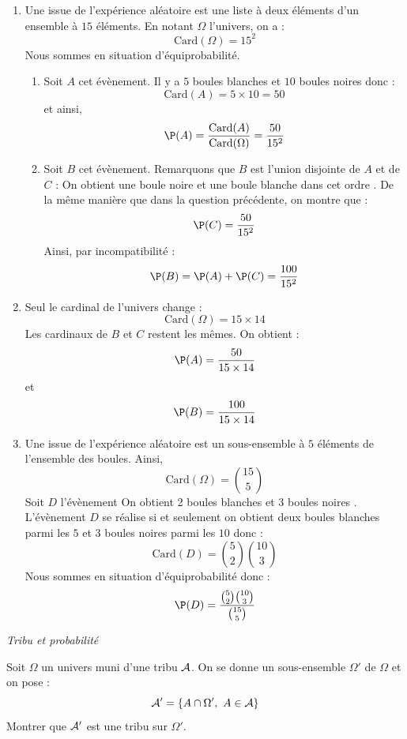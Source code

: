 \documentclass[a4paper,10pt]{report}
\begin{document}
\corr 

\begin{enumerate}
\item Une issue de l'expérience aléatoire est une liste à deux éléments d'un ensemble à $15$ éléments. En notant $\Omega$ l'univers, on a :
$$ \textrm{Card}(\Omega)= 15^2$$
Nous sommes en situation d'équiprobabilité.

\begin{enumerate}
\item Soit $A$ cet évènement. Il y a $5$ boules blanches et $10$ boules noires donc :
$$ \textrm{Card}(A)= 5 \times 10 = 50$$
et ainsi,
$$ \P(A) = \dfrac{\textrm{Card}(A)}{\textrm{Card}(\Omega)} = \dfrac{50}{15^2}$$
\item Soit $B$ cet évènement. Remarquons que $B$ est l'union disjointe de $A$ et de $C$ : \og On obtient une boule noire et une boule blanche dans cet ordre \fg. De la même manière que dans la question précédente, on montre que :
$$ \P(C) = \dfrac{50}{15^2}$$
Ainsi, par incompatibilité :
$$ \P(B) = \P(A)+ \P(C) = \dfrac{100}{15^2}$$
\end{enumerate}
\item Seul le cardinal de l'univers change : 
$$ \textrm{Card}(\Omega)= 15 \times 14$$
Les cardinaux de $B$ et $C$ restent les mêmes. On obtient :
$$ \P(A)   = \dfrac{50}{15 \times 14}$$
et 
$$ \P(B)   = \dfrac{100}{15 \times 14}$$
\item Une issue de l'expérience aléatoire est un sous-ensemble à $5$ éléments de l'ensemble des boules. Ainsi,
$$ \textrm{Card}(\Omega)= \binom{15}{5} $$
Soit $D$ l'évènement \og On obtient 2 boules blanches et 3 boules noires \fg. L'évènement $D$ se réalise si et seulement on obtient deux boules blanches parmi les $5$ et $3$ boules noires parmi les $10$ donc :
$$ \textrm{Card}(D) = \binom{5}{2} \binom{10}{3}$$
Nous sommes en situation d'équiprobabilité donc :
$$ \P(D) = \dfrac{\binom{5}{2} \binom{10}{3}}{\binom{15}{5}}$$
\end{enumerate}

\newpage


\medskip

\begin{center}
\textit{{ {\large Tribu et probabilité}}}
\end{center}

\medskip


\begin{Exercice}{} Soit $\Omega$ un univers muni d'une tribu ${\cal A}$. On se donne un sous-ensemble $\Omega'$ de $\Omega$ et on pose :
 $${\cal A}'=\{A\cap \Omega',\ A\in{\cal A}\}$$
Montrer que ${\cal A}'$ est une tribu sur $\Omega'.$
\end{Exercice}
\end{document}
